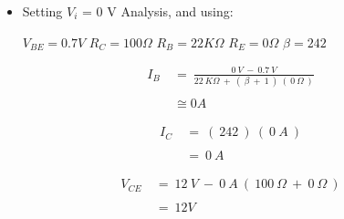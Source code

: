 \pagebreak

{\bfseries\itshape
\begin{itemize}
\item Setting $V_{i}$ = 0 V Analysis, and using:
\begin{tasks}
\task $V_{BE} =  0.7 V$
\task $R_{C} = 100 \Omega$ 
\task $R_{B} = 22K \Omega$ 
\task $R_{E} = 0 \Omega$ 
\task $\beta = 242$ 
\end{tasks}
\end{itemize}} \hfill \break

{\bfseries\itshape{}} 

\begin{flushright}
{\bfseries\itshape{}} \hfill \break
\end{flushright}

\begin{ceqn}
\begin{align}
I_{B}\ &=\ \frac{0\ V\ -\ 0.7\ V}{22\ K\Omega\ +\ (\ \beta\ +\ 1\ )\ (\ 0\ \Omega\ )} \\ \\
&\cong 0 A
\end{align}
\end{ceqn} \hfill \break

{\bfseries\itshape{}} 

\begin{flushright}
{\bfseries\itshape{}} \hfill \break
\end{flushright}

\begin{ceqn}
\begin{align}
I_{C}\ &=\ (\ 242\ )\ (\ 0\ A\ ) \\ \\
&=\ 0\ A
\end{align}
\end{ceqn} \hfill \break

{\bfseries\itshape{}}

\begin{flushright}
{\bfseries\itshape{}} \hfill \break
\end{flushright}

\begin{ceqn}
\begin{align}
V_{CE}\ &=\ 12\ V\ -\ 0\ A\ (\ 100\ \Omega\ +\ 0\ \Omega\ ) \\ \\
&=\ 12 V
\end{align}
\end{ceqn} \hfill \break

\pagebreak